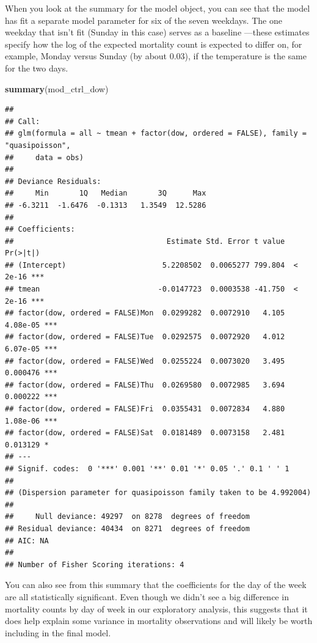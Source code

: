 \documentclass[
]{book}
\newenvironment{Shaded}{\begin{snugshade}}{\end{snugshade}}
\newcommand{\KeywordTok}[1]{\textcolor[rgb]{0.13,0.29,0.53}{\textbf{#1}}}
\newcommand{\NormalTok}[1]{#1}
\begin{document}
When you look at the summary for the model object, you can see that the
model has fit a separate model parameter for six of the seven weekdays. The one
weekday that isn't fit (Sunday in this case) serves as a baseline ---these
estimates specify how the log of the expected mortality count is expected to
differ on, for example, Monday versus Sunday (by about 0.03), if the temperature
is the same for the two days.

\begin{Shaded}
\begin{Highlighting}[]
\KeywordTok{summary}\NormalTok{(mod_ctrl_dow)}
\end{Highlighting}
\end{Shaded}

\begin{verbatim}
## 
## Call:
## glm(formula = all ~ tmean + factor(dow, ordered = FALSE), family = "quasipoisson", 
##     data = obs)
## 
## Deviance Residuals: 
##     Min       1Q   Median       3Q      Max  
## -6.3211  -1.6476  -0.1313   1.3549  12.5286  
## 
## Coefficients:
##                                   Estimate Std. Error t value Pr(>|t|)    
## (Intercept)                      5.2208502  0.0065277 799.804  < 2e-16 ***
## tmean                           -0.0147723  0.0003538 -41.750  < 2e-16 ***
## factor(dow, ordered = FALSE)Mon  0.0299282  0.0072910   4.105 4.08e-05 ***
## factor(dow, ordered = FALSE)Tue  0.0292575  0.0072920   4.012 6.07e-05 ***
## factor(dow, ordered = FALSE)Wed  0.0255224  0.0073020   3.495 0.000476 ***
## factor(dow, ordered = FALSE)Thu  0.0269580  0.0072985   3.694 0.000222 ***
## factor(dow, ordered = FALSE)Fri  0.0355431  0.0072834   4.880 1.08e-06 ***
## factor(dow, ordered = FALSE)Sat  0.0181489  0.0073158   2.481 0.013129 *  
## ---
## Signif. codes:  0 '***' 0.001 '**' 0.01 '*' 0.05 '.' 0.1 ' ' 1
## 
## (Dispersion parameter for quasipoisson family taken to be 4.992004)
## 
##     Null deviance: 49297  on 8278  degrees of freedom
## Residual deviance: 40434  on 8271  degrees of freedom
## AIC: NA
## 
## Number of Fisher Scoring iterations: 4
\end{verbatim}

You can also see from this summary that the coefficients for the day of the
week are all statistically significant. Even though we didn't see a big
difference in mortality counts by day of week in our exploratory analysis,
this suggests that it does help explain some variance in mortality observations
and will likely be worth including in the final model.
\end{document}
